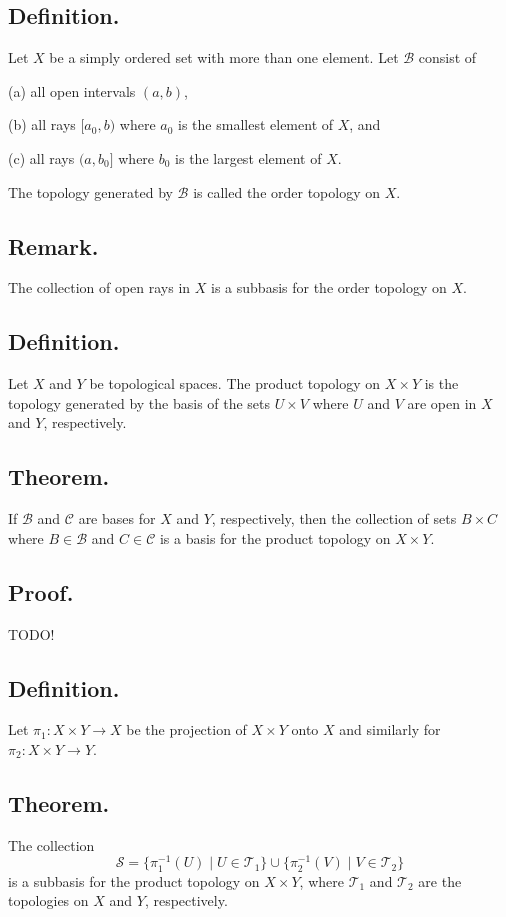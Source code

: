 \documentclass[titlepage]{article}
\begin{document}
\subsection{Definition.} Let $X$ be a simply ordered set with more than one element. Let $\mathcal{B}$ consist of 

(a) all open intervals $(a, b)$,

(b) all rays $[a_{0}, b)$ where $a_{0}$ is the smallest element of $X$, and

(c) all rays $(a, b_{0}]$ where $b_{0}$ is the largest element of $X$.

The topology generated by $\mathcal{B}$ is called the order topology on $X$.

\subsection{Remark.} The collection of open rays in $X$ is a subbasis for the order topology on $X$.

\subsection{Definition.} Let $X$ and $Y$ be topological spaces. The product topology on $X \times Y$ is the topology generated by the basis of the sets $U \times V$ where $U$ and $V$ are open in $X$ and $Y$, respectively.

\subsection{Theorem.} If $\mathcal{B}$ and $\mathcal{C}$ are bases for $X$ and $Y$, respectively, then the collection of sets $B \times C$ where $B \in \mathcal{B}$ and $C \in \mathcal{C}$ is a basis for the product topology on $X \times Y$.

\subsection{Proof.} TODO!

\subsection{Definition.} Let $\pi_{1}: X \times Y \to X$ be the projection of $X \times Y$ onto $X$ and similarly for $\pi_{2}: X \times Y \to Y$.

\subsection{Theorem.} The collection 
$$\mathcal{S} = \{\pi_{1}^{-1}(U) \mid U \in \mathcal{T}_{1}\} \cup \{\pi_{2}^{-1}(V) \mid V \in \mathcal{T}_{2}\}$$
is a subbasis for the product topology on $X \times Y$, where $\mathcal{T}_{1}$ and $\mathcal{T}_{2}$ are the topologies on $X$ and $Y$, respectively.
\end{document}
